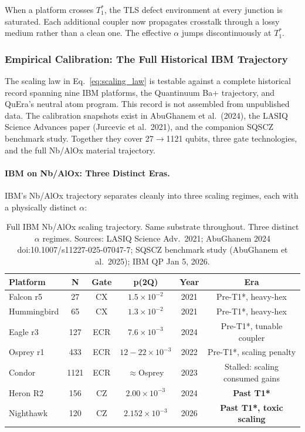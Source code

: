 \documentclass[12pt,a4paper]{article}
\begin{document}
When a platform crosses $T_1^*$, the TLS defect environment at every junction
is saturated. Each additional coupler now propagates crosstalk through a lossy
medium rather than a clean one. The effective $\alpha$ jumps discontinuously
at $T_1^*$.

\subsubsection{Empirical Calibration: The Full Historical IBM Trajectory}

The scaling law in Eq.~\eqref{eq:scaling_law} is testable against a complete
historical record spanning nine IBM platforms, the Quantinuum Ba+ trajectory,
and QuEra's neutral atom program. This record is not assembled from unpublished
data. The calibration snapshots exist in AbuGhanem et al.\ (2024), the LASIQ
Science Advances paper (Jurcevic et al.\ 2021), and the companion SQSCZ
benchmark study. Together they cover 27$\to$1121 qubits, three gate
technologies, and the full Nb/AlOx material trajectory.

\paragraph{IBM on Nb/AlOx: Three Distinct Eras.}

IBM's Nb/AlOx trajectory separates cleanly into three scaling regimes,
each with a physically distinct $\alpha$:

\begin{table}[h]
\centering
\caption{Full IBM Nb/AlOx scaling trajectory. Same substrate throughout.
Three distinct $\alpha$ regimes. Sources: LASIQ Science Adv.\ 2021;
AbuGhanem 2024 doi:10.1007/s11227-025-07047-7; SQSCZ benchmark study
(AbuGhanem et al.\ 2025); IBM QP Jan 5, 2026.}
\label{tab:ibm_full}
\small
\begin{tabular}{lccccc}
\toprule
\textbf{Platform} & \textbf{N} & \textbf{Gate} & \textbf{p(2Q)} & \textbf{Year} & \textbf{Era} \\
\midrule
Falcon r5    &  27  & CX  & $1.5\times10^{-2}$  & 2021 & Pre-T1*, heavy-hex \\
Hummingbird  &  65  & CX  & $1.3\times10^{-2}$  & 2021 & Pre-T1*, heavy-hex \\
Eagle r3     & 127  & ECR & $7.6\times10^{-3}$  & 2024 & Pre-T1*, tunable coupler \\
Osprey r1    & 433  & ECR & $12{-}22\times10^{-3}$& 2022& Pre-T1*, scaling penalty \\
Condor       &1121  & ECR & $\approx$Osprey     & 2023 & Stalled: scaling consumed gains \\
\midrule
Heron R2     & 156  & CZ  & $2.00\times10^{-3}$ & 2024 & \textbf{Past T1*} \\
Nighthawk    & 120  & CZ  & $2.152\times10^{-3}$& 2026 & \textbf{Past T1*, toxic scaling} \\
\bottomrule
\end{tabular}
\end{table}
\end{document}

